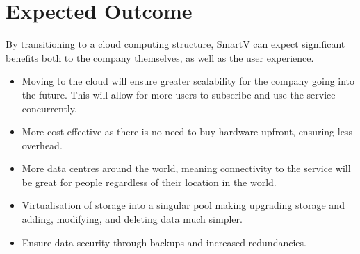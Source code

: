 \section{Expected Outcome}

By transitioning to a cloud computing structure, SmartV can expect significant benefits both to the company themselves, as well as the user experience. 

\begin{itemize}

    \item Moving to the cloud will ensure greater scalability for the company going into the future. This will allow for more users to subscribe and use the service concurrently. 

    \item More cost effective as there is no need to buy hardware upfront, ensuring less overhead. 

    \item More data centres around the world, meaning connectivity to the service will be great for people regardless of their location in the world.

    \item Virtualisation of storage into a singular pool making upgrading storage and adding, modifying, and deleting data much simpler.

    \item Ensure data security through backups and increased redundancies.


\end{itemize}